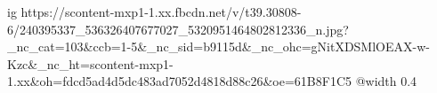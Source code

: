  
 
 
 
 

\ifcmt
  ig https://scontent-mxp1-1.xx.fbcdn.net/v/t39.30808-6/240395337_536326407677027_5320951464802812336_n.jpg?_nc_cat=103&ccb=1-5&_nc_sid=b9115d&_nc_ohc=gNitXDSMlOEAX-w-Kzc&_nc_ht=scontent-mxp1-1.xx&oh=fdcd5ad4d5dc483ad7052d4818d88c26&oe=61B8F1C5
  @width 0.4
\fi
